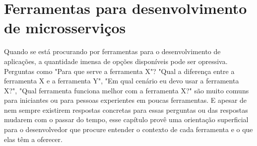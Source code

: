 \chapter{Ferramentas para desenvolvimento de microsserviços}\label{chapter-ferramentas}




Quando se está procurando por ferramentas para o desenvolvimento de aplicações, a quantidade imensa de opções disponíveis pode ser opressiva. Perguntas como "Para que serve a ferramenta X"? "Qual a diferença entre a ferramenta X e a ferramenta Y", "Em qual cenário eu devo usar a ferramenta X?", "Qual ferramenta funciona melhor com a ferramenta X?" são muito comuns para iniciantes ou para pessoas experientes em poucas ferramentas. E apesar de nem sempre existirem respostas concretas para essas perguntas ou das respostas mudarem com o passar do tempo, esse capítulo provê uma orientação superficial para o desenvolvedor que procure entender o contexto de cada ferramenta e o que elas têm a oferecer.



